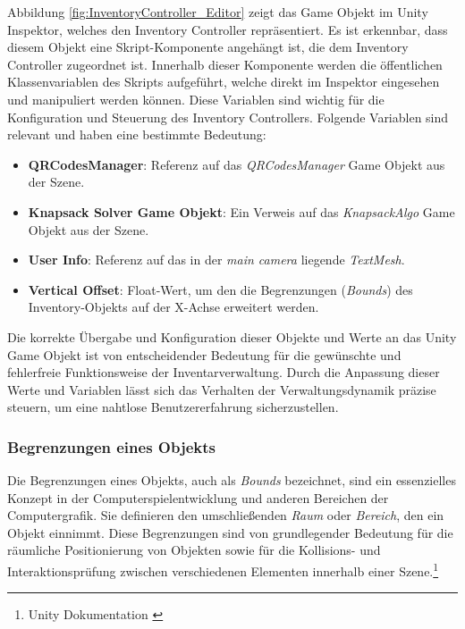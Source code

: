 Abbildung \ref{fig:InventoryController_Editor} zeigt das Game Objekt im Unity Inspektor, welches den Inventory Controller
repräsentiert. Es ist erkennbar, dass diesem Objekt eine Skript-Komponente angehängt ist, die dem Inventory Controller
zugeordnet ist. Innerhalb dieser Komponente werden die öffentlichen Klassenvariablen des Skripts aufgeführt, welche direkt
im Inspektor eingesehen und manipuliert werden können. Diese Variablen sind wichtig für die Konfiguration und Steuerung
des Inventory Controllers. Folgende Variablen sind relevant und haben eine bestimmte Bedeutung:

\begin{itemize}
    \item \textbf{QRCodesManager}: Referenz auf das \textit{QRCodesManager} Game Objekt aus der  Szene.

    \item \textbf{Knapsack Solver Game Objekt}: Ein Verweis auf das \textit{KnapsackAlgo} Game Objekt aus der Szene.

    \item \textbf{User Info}: Referenz auf das in der \textit{main camera} liegende \textit{TextMesh}.

    \item \textbf{Vertical Offset}: Float-Wert, um den die Begrenzungen (\textit{Bounds}) des Inventory-Objekts auf der
    X-Achse erweitert werden.
\end{itemize}

Die korrekte Übergabe und Konfiguration dieser Objekte und Werte an das Unity Game Objekt ist von entscheidender Bedeutung
für die gewünschte und fehlerfreie Funktionsweise der Inventarverwaltung. Durch die Anpassung dieser Werte und Variablen
lässt sich das Verhalten der Verwaltungsdynamik präzise steuern, um eine nahtlose Benutzererfahrung sicherzustellen.

\subsubsection{Begrenzungen eines Objekts}
Die Begrenzungen eines Objekts, auch als \textit{Bounds} bezeichnet, sind ein essenzielles Konzept in der Computerspielentwicklung
und anderen Bereichen der Computergrafik. Sie definieren den umschließenden \textit{Raum} oder \textit{Bereich}, den ein
Objekt einnimmt. Diese Begrenzungen sind von grundlegender Bedeutung für die räumliche Positionierung von Objekten sowie
für die Kollisions- und Interaktionsprüfung zwischen verschiedenen Elementen innerhalb einer Szene.\footnote{Unity Dokumentation \cite{Bounds}}

